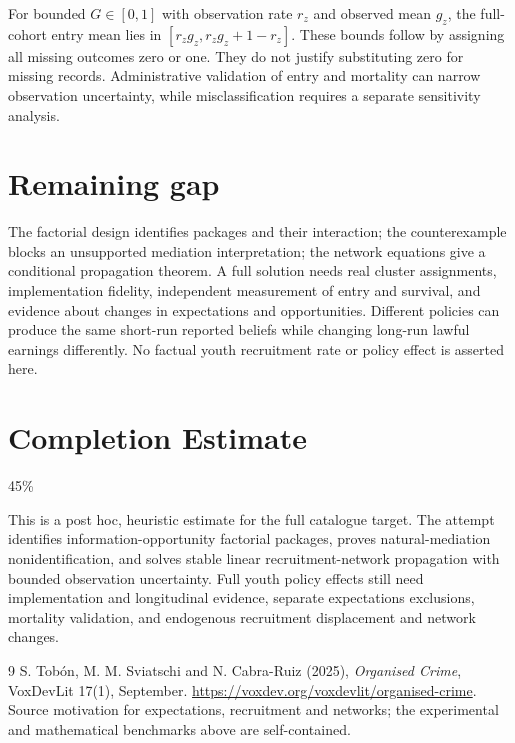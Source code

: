 \documentclass[11pt,a4paper]{article}
\begin{document}
For bounded $G\in[0,1]$ with observation rate $r_z$ and observed mean $g_z$, the full-cohort entry mean lies in $[r_zg_z,r_zg_z+1-r_z]$. These bounds follow by assigning all missing outcomes zero or one. They do not justify substituting zero for missing records. Administrative validation of entry and mortality can narrow observation uncertainty, while misclassification requires a separate sensitivity analysis.

\section{Remaining gap}
The factorial design identifies packages and their interaction; the counterexample blocks an unsupported mediation interpretation; the network equations give a conditional propagation theorem. A full solution needs real cluster assignments, implementation fidelity, independent measurement of entry and survival, and evidence about changes in expectations and opportunities. Different policies can produce the same short-run reported beliefs while changing long-run lawful earnings differently. No factual youth recruitment rate or policy effect is asserted here.

\section{Completion Estimate}
45\%

This is a post hoc, heuristic estimate for the full catalogue target.
The attempt identifies information-opportunity factorial packages, proves natural-mediation nonidentification, and solves stable linear recruitment-network propagation with bounded observation uncertainty. Full youth policy effects still need implementation and longitudinal evidence, separate expectations exclusions, mortality validation, and endogenous recruitment displacement and network changes.

\begin{thebibliography}{9}
 S. Tob\'on, M. M. Sviatschi and N. Cabra-Ruiz (2025), \emph{Organised Crime}, VoxDevLit 17(1), September. \url{https://voxdev.org/voxdevlit/organised-crime}. Source motivation for expectations, recruitment and networks; the experimental and mathematical benchmarks above are self-contained.
\end{thebibliography}
\end{document}
